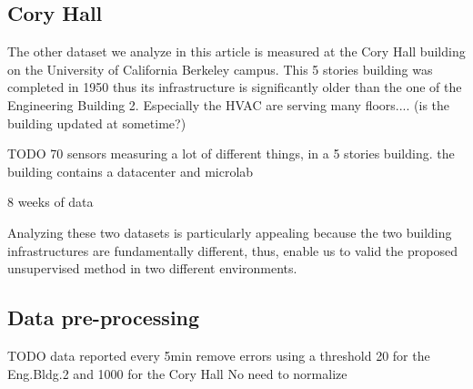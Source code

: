 \subsection{Cory Hall}
The other dataset we analyze in this article is measured at the Cory Hall building on the University of California Berkeley campus.
This 5 stories building was completed in 1950 thus its infrastructure is significantly older than the one of the Engineering Building 2.
Especially the HVAC are serving many floors.... (is the building updated at sometime?)

TODO
70 sensors measuring a lot of different things, in a 5 stories building. 
the building contains a datacenter and microlab 

8 weeks of data


Analyzing these two datasets is particularly appealing because the two building infrastructures are fundamentally different, thus, enable us to valid the proposed unsupervised method in two different environments.

\subsection{Data pre-processing}
TODO
data reported every 5min 
remove errors using a threshold 20 for the Eng.Bldg.2 and 1000 for the Cory Hall
No need to normalize 
